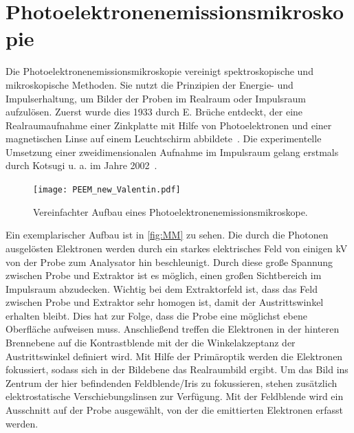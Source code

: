     \section{Photoelektronenemissionsmikroskopie} \label{sec:PEEM}
        Die Photoelektronenemissionsmikroskopie vereinigt spektroskopische und mikroskopische Methoden. %
        Sie nutzt die Prinzipien der Energie- und Impulserhaltung, um Bilder der Proben im Realraum oder Impulsraum aufzulösen.
        Zuerst wurde dies 1933 durch E. Brüche entdeckt, der eine Realraumaufnahme einer Zinkplatte mit Hilfe von Photoelektronen und einer magnetischen Linse auf einem Leuchtschirm abbildete~\cite{bruche_elektronenmikroskopische_1933}.
        Die experimentelle Umsetzung einer zweidimensionalen Aufnahme im Impulsraum gelang erstmals durch Kotsugi u. a. im Jahre 2002~\cite{kotsugi_microspectroscopic_2003}.
        
        \begin{figure}
            \centering
            \texttt{[image: PEEM\_new\_Valentin.pdf]}
            \caption{Vereinfachter Aufbau eines Photoelektronenemissionsmikroskope.} 
            \label{fig:MM}
        \end{figure}
        Ein exemplarischer Aufbau ist in \autoref{fig:MM} zu sehen.
        Die durch die Photonen ausgelösten Elektronen werden durch ein starkes elektrisches Feld von einigen \si{\kilo\volt} von der Probe zum Analysator hin beschleunigt.
        Durch diese große Spannung zwischen Probe und Extraktor ist es möglich, einen großen Sichtbereich im Impulsraum abzudecken.
        Wichtig bei dem Extraktorfeld ist, dass das Feld zwischen Probe und Extraktor sehr homogen ist, damit der Austrittswinkel erhalten bleibt.
        Dies hat zur Folge, dass die Probe eine möglichst ebene Oberfläche aufweisen muss.
        Anschließend treffen die Elektronen in der hinteren Brennebene auf die Kontrastblende mit der die Winkelakzeptanz der Austrittswinkel definiert wird.
        Mit Hilfe der Primäroptik werden die Elektronen fokussiert, sodass sich in der Bildebene das Realraumbild ergibt.
        Um das Bild ins Zentrum der hier befindenden Feldblende/Iris zu fokussieren, stehen zusätzlich elektrostatische Verschiebungslinsen zur Verfügung.
        Mit der Feldblende wird ein Ausschnitt auf der Probe ausgewählt, von der die emittierten Elektronen erfasst werden.


